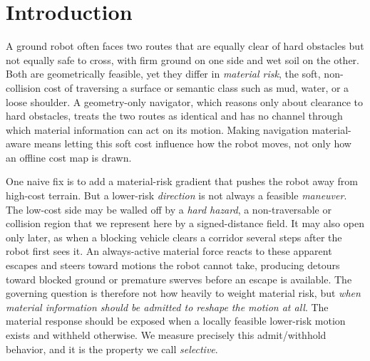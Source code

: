 \section{Introduction}
\label{sec:intro}

A ground robot often faces two routes that are equally clear of hard obstacles but not equally safe to cross, with firm ground on one side and wet soil on the other. Both are geometrically feasible, yet they differ in \emph{material risk}, the soft, non-collision cost of traversing a surface or semantic class such as mud, water, or a loose shoulder. A geometry-only navigator, which reasons only about clearance to hard obstacles, treats the two routes as identical and has no channel through which material information can act on its motion. Making navigation material-aware means letting this soft cost influence how the robot moves, not only how an offline cost map is drawn.

One naive fix is to add a material-risk gradient that pushes the robot away from high-cost terrain. But a lower-risk \emph{direction} is not always a feasible \emph{maneuver}. The low-cost side may be walled off by a \emph{hard hazard}, a non-traversable or collision region that we represent here by a signed-distance field. It may also open only later, as when a blocking vehicle clears a corridor several steps after the robot first sees it. An always-active material force reacts to these apparent escapes and steers toward motions the robot cannot take, producing detours toward blocked ground or premature swerves before an escape is available. The governing question is therefore not how heavily to weight material risk, but \emph{when material information should be admitted to reshape the motion at all}. The material response should be exposed when a locally feasible lower-risk motion exists and withheld otherwise. We measure precisely this admit/withhold behavior, and it is the property we call \emph{selective}.

